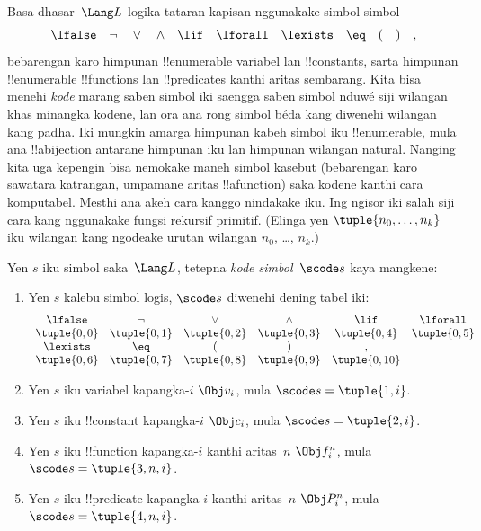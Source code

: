 \documentclass[../../../include/open-logic-section]{subfiles}
\begin{document}

Basa dhasar~$\Lang L$ logika tataran kapisan
nggunakake simbol-simbol
\[
\lfalse \quad \lnot \quad \lor \quad \land \quad \lif \quad \lforall
\quad \lexists \quad \eq \quad ( \quad ) \quad ,
\]
bebarengan karo himpunan !!{enumerable}
variabel lan !!{constant}s, sarta himpunan
!!{enumerable} !!{function}s lan
!!{predicate}s kanthi aritas sembarang.
Kita bisa menehi \emph{kode} marang saben
simbol iki saengga saben simbol nduwé siji
wilangan khas minangka kodene, lan ora ana
rong simbol béda kang diwenehi wilangan
kang padha. Iki mungkin amarga himpunan
kabeh simbol iku !!{enumerable}, mula ana
!!a{bijection} antarane himpunan iku lan
himpunan wilangan natural. Nanging kita uga
kepengin bisa nemokake maneh simbol kasebut
(bebarengan karo sawatara katrangan, umpamane
aritas !!a{function}) saka kodene kanthi
cara komputabel. Mesthi ana akeh cara kanggo
nindakake iku. Ing ngisor iki salah siji cara
kang nggunakake fungsi rekursif primitif.
(Elinga yen $\tuple{n_0, \dots, n_k}$ iku
wilangan kang ngodeake urutan wilangan
$n_0$, \dots, $n_k$.)

\begin{defn}
Yen $s$ iku simbol saka~$\Lang L$,
tetepna \emph{kode simbol}~$\scode s$
kaya mangkene:
\begin{enumerate}
\item Yen $s$ kalebu simbol logis,
  $\scode s$ diwenehi dening tabel iki:
\[
\begin{array}{cccccccccc}
  \lfalse & \lnot & \lor & \land & \lif & \lforall \\
\tuple{0, 0} & \tuple{0, 1} & \tuple{0, 2} & \tuple{0, 3} &
\tuple{0, 4} & \tuple{0, 5} \\
\lexists & \eq & ( & ) & ,\\
\tuple{0, 6} & \tuple{0, 7} &
\tuple{0, 8} & \tuple{0, 9} & \tuple{0, 10}
\end{array}
\]
\item Yen $s$ iku variabel kapangka-$i$
  $\Obj v_i$, mula $\scode s = \tuple{1, i}$.
\item Yen $s$ iku !!{constant} kapangka-$i$
  $\Obj c_i$, mula $\scode s = \tuple{2, i}$.
\item Yen $s$ iku !!{function} kapangka-$i$
  kanthi aritas~$n$ $\Obj f_i^n$, mula
  $\scode s = \tuple{3, n, i}$.
\item Yen $s$ iku !!{predicate} kapangka-$i$
  kanthi aritas~$n$ $\Obj P_i^n$, mula
  $\scode s = \tuple{4, n, i}$.
\end{enumerate}
\end{defn}
\end{document}
